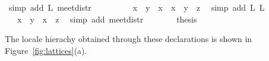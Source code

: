\begin{isabellebody}
\ {\isacharparenleft}simp\ add{\isacharcolon}\ L{}\ meet{\isacharunderscore}distr{\isacharparenright}\isanewline
\ \ \ \ \isamarkupfalse%
\ \isamarkupfalse%
\ {\isachardoublequoteopen}{\isachardot}{\isachardot}{\isachardot}\ {\isacharequal}\ {\isacharparenleft}{\isacharparenleft}x\ {\isasymsqunion}\ y{\isacharparenright}\ {\isasymsqinter}\ x{\isacharparenright}\ {\isasymsqunion}\ {\isacharparenleft}{\isacharparenleft}x\ {\isasymsqunion}\ y{\isacharparenright}\ {\isasymsqinter}\ z{\isacharparenright}{\isachardoublequoteclose}\ \isamarkupfalse%
\ {\isacharparenleft}simp\ add{\isacharcolon}\ L{}\ L{}{\isacharparenright}\isanewline
\ \ \ \ \isamarkupfalse%
\ \isamarkupfalse%
\ {\isachardoublequoteopen}{\isachardot}{\isachardot}{\isachardot}\ {\isacharequal}\ {\isacharparenleft}x\ {\isasymsqunion}\ y{\isacharparenright}\ {\isasymsqinter}\ {\isacharparenleft}x\ {\isasymsqunion}\ z{\isacharparenright}{\isachardoublequoteclose}\ \isamarkupfalse%
\ {\isacharparenleft}simp\ add{\isacharcolon}\ meet{\isacharunderscore}distr{\isacharparenright}\isanewline
\ \ \ \ \isamarkupfalse%
\ \isamarkupfalse%
\ {\isacharquery}thesis\ \isacommand{{\isachardot}}\isamarkupfalse%
\isanewline
\ \ \isamarkupfalse%
%
\endisatagproof
{\isafoldproof}%
%
\isadelimproof
%
\endisadelimproof
%
\begin{isamarkuptext}%
The locale hierachy obtained through these declarations is shown in Figure~\ref{fig:lattices}(a).


\end{isamarkuptext}
\end{isabellebody}
